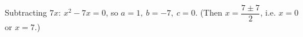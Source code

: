 Subtracting $7x$: $\boxed{x^2-7x=0}$, so $\boxed{a=1,\ b=-7,\ c=0}$. (Then $x=\dfrac{7\pm7}{2}$, i.e. $x=0$ or $x=7$.)
